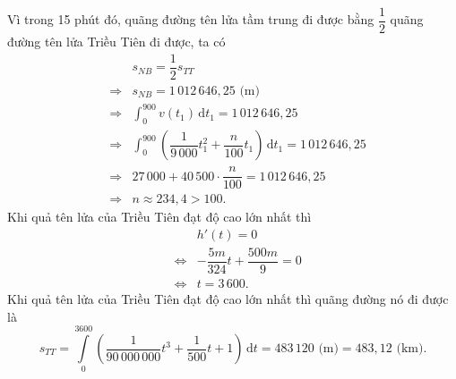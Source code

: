 \begin{ex}
{\begin{itemchoice}
			Vì trong 15 phút đó, quãng đường tên lửa tầm trung đi được bằng $\dfrac{1}{2}$ quãng đường tên lửa Triều Tiên đi được, ta có
			\allowdisplaybreaks
			\begin{eqnarray*}
				&& s_{NB}=\dfrac{1}{2}s_{TT} \\
				&\Rightarrow& s_{NB}=1\,012\,646{,}25 \text{ (m)}\\
				&\Rightarrow& \displaystyle\int_0^{900} v(t_1)\mathrm{\,d}t_1 =1\,012\,646{,}25\\
				&\Rightarrow& \displaystyle\int_0^{900} \left( \dfrac{1}{9\,000}t_1^2+\dfrac{n}{100}t_1\right) \mathrm{\,d}t_1 =1\,012\,646{,}25\\
				&\Rightarrow& 27\,000+40\,500\cdot\dfrac{n}{100} =1\,012\,646{,}25\\
				&\Rightarrow& n \approx234{,}4>100.
			\end{eqnarray*}
			\itemch Khi quả tên lửa của Triều Tiên đạt độ cao lớn nhất thì
			\begin{eqnarray*}
				&& h'(t)=0 \\
				&\Leftrightarrow& -\dfrac{5m}{324}t+\dfrac{500m}{9}=0\\
				&\Leftrightarrow& t=3\,600.
			\end{eqnarray*}
			Khi quả tên lửa của Triều Tiên đạt độ cao lớn nhất thì quãng đường nó đi được là
			\[{s_{TT}}=\displaystyle\int\limits_0^{3600}{\left( \dfrac{1}{90\,000\,000}t^3+\dfrac{1}{500}t+1 \right)\mathrm{\,d}t}=483\,120\text{ (m)}=483{,}12 \text{ (km).}\]
		\end{itemchoice}
	}
\end{ex}

